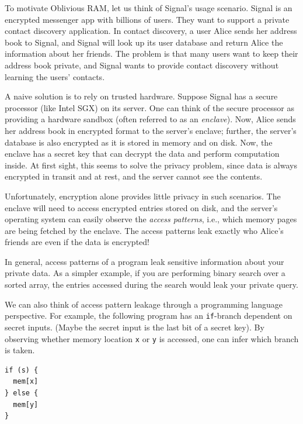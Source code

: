\newcommand{\op}{{\texttt{op}}}
\newcommand{\addr}{{\texttt{addr}}}
\newcommand{\data}{{\texttt{data}}}

To motivate Oblivious RAM, let us think of Signal's usage scenario.
Signal is an encrypted messenger app with billions of users. They want
to support a private contact discovery application. In contact
discovery, a user Alice sends her address book to Signal, and Signal
will look up its user database and return Alice the information about
her friends. The problem is that many users want to keep their address
book private, and Signal wants to provide contact discovery without
learning the users' contacts.

A naive solution is to rely on trusted hardware. Suppose Signal has a
secure processor (like Intel SGX) on its server. One can think of the
secure processor as providing a hardware sandbox (often referred to as
an \emph{enclave}). Now, Alice sends her address book in encrypted
format to the server's enclave; further, the server's database is also
encrypted as it is stored in memory and on disk. Now, the enclave has a
secret key that can decrypt the data and perform computation inside. At
first sight, this seems to solve the privacy problem, since data is
always encrypted in transit and at rest, and the server cannot see the
contents.

Unfortunately, encryption alone provides little privacy in such
scenarios. The enclave will need to access encrypted entries stored on
disk, and the server's operating system can easily observe the
\emph{access patterns}, i.e., which memory pages are being fetched by
the enclave. The access patterns leak exactly who Alice's friends are
even if the data is encrypted!

In general, access patterns of a program leak sensitive information
about your private data. As a simpler example, if you are performing
binary search over a sorted array, the entries accessed during the
search would leak your private query.

We can also think of access pattern leakage through a programming
language perspective. For example, the following program has an
\texttt{if}-branch dependent on secret inputs. (Maybe the secret input
is the last bit of a secret key). By observing whether memory location
\texttt{x} or \texttt{y} is accessed, one can infer which branch is
taken.

\begin{center}
\begin{minipage}{22mm}
\begin{verbatim}
if (s) {
  mem[x]
} else {
  mem[y]
}
\end{verbatim}
\end{minipage}
\end{center}


